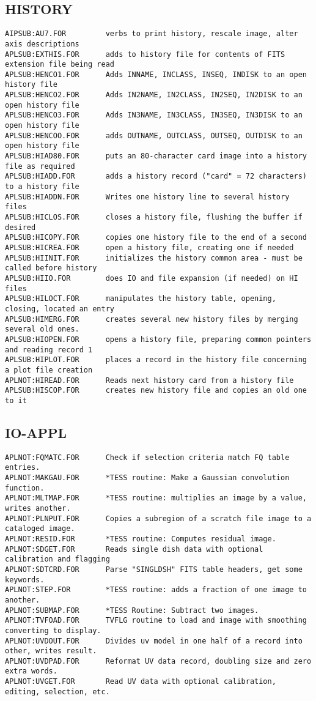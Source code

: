 \subsection{HISTORY}
\begin{verbatim}
AIPSUB:AU7.FOR         verbs to print history, rescale image, alter axis descriptions
APLSUB:EXTHIS.FOR      adds to history file for contents of FITS extension file being read
APLSUB:HENCO1.FOR      Adds INNAME, INCLASS, INSEQ, INDISK to an open history file
APLSUB:HENCO2.FOR      Adds IN2NAME, IN2CLASS, IN2SEQ, IN2DISK to an open history file
APLSUB:HENCO3.FOR      Adds IN3NAME, IN3CLASS, IN3SEQ, IN3DISK to an open history file
APLSUB:HENCOO.FOR      adds OUTNAME, OUTCLASS, OUTSEQ, OUTDISK to an open history file
APLSUB:HIAD80.FOR      puts an 80-character card image into a history file as required
APLSUB:HIADD.FOR       adds a history record ("card" = 72 characters) to a history file
APLSUB:HIADDN.FOR      Writes one history line to several history files
APLSUB:HICLOS.FOR      closes a history file, flushing the buffer if desired
APLSUB:HICOPY.FOR      copies one history file to the end of a second
APLSUB:HICREA.FOR      open a history file, creating one if needed
APLSUB:HIINIT.FOR      initializes the history common area - must be called before history
APLSUB:HIIO.FOR        does IO and file expansion (if needed) on HI files
APLSUB:HILOCT.FOR      manipulates the history table, opening, closing, located an entry
APLSUB:HIMERG.FOR      creates several new history files by merging several old ones.
APLSUB:HIOPEN.FOR      opens a history file, preparing common pointers and reading record 1
APLSUB:HIPLOT.FOR      places a record in the history file concerning a plot file creation
APLNOT:HIREAD.FOR      Reads next history card from a history file
APLSUB:HISCOP.FOR      creates new history file and copies an old one to it
\end{verbatim}
 
\subsection{IO-APPL}
\begin{verbatim}
APLNOT:FQMATC.FOR      Check if selection criteria match FQ table entries.
APLNOT:MAKGAU.FOR      *TESS routine: Make a Gaussian convolution function.
APLNOT:MLTMAP.FOR      *TESS routine: multiplies an image by a value, writes another.
APLNOT:PLNPUT.FOR      Copies a subregion of a scratch file image to a cataloged image.
APLNOT:RESID.FOR       *TESS routine: Computes residual image.
APLNOT:SDGET.FOR       Reads single dish data with optional calibration and flagging
APLNOT:SDTCRD.FOR      Parse "SINGLDSH" FITS table headers, get some keywords.
APLNOT:STEP.FOR        *TESS routine: adds a fraction of one image to another.
APLNOT:SUBMAP.FOR      *TESS Routine: Subtract two images.
APLNOT:TVFOAD.FOR      TVFLG routine to load and image with smoothing converting to display.
APLNOT:UVDOUT.FOR      Divides uv model in one half of a record into other, writes result.
APLNOT:UVDPAD.FOR      Reformat UV data record, doubling size and zero extra words.
APLNOT:UVGET.FOR       Read UV data with optional calibration, editing, selection, etc.
\end{verbatim}
 
